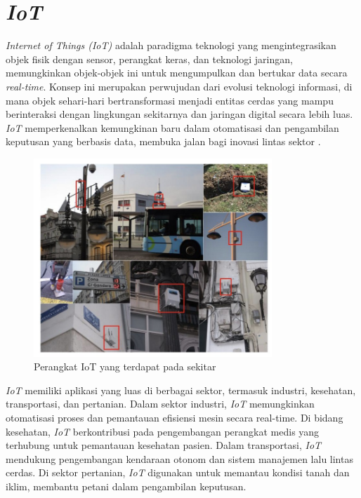 \section{\textit{IoT}}

\textit{Internet of Things (IoT)} adalah paradigma teknologi yang mengintegrasikan objek fisik dengan sensor, perangkat keras, dan teknologi jaringan, memungkinkan objek-objek ini untuk mengumpulkan dan bertukar data secara \textit{real-time}. Konsep ini merupakan perwujudan dari evolusi teknologi informasi, di mana objek sehari-hari bertransformasi menjadi entitas cerdas yang mampu berinteraksi dengan lingkungan sekitarnya dan jaringan digital secara lebih luas. \textit{IoT} memperkenalkan kemungkinan baru dalam otomatisasi dan pengambilan keputusan yang berbasis data, membuka jalan bagi inovasi lintas sektor \parencite{madakam2015internet}.

\begin{figure}[ht]
  \centering
  \includegraphics[width=0.8\textwidth]{resources/chapter-2/gambar-iot.jpg}
  \caption{Perangkat IoT yang terdapat pada sekitar \parencite{sotres2017practical}}
\end{figure}

\textit{IoT} memiliki aplikasi yang luas di berbagai sektor, termasuk industri, kesehatan, transportasi, dan pertanian. Dalam sektor industri, \textit{IoT} memungkinkan otomatisasi proses dan pemantauan efisiensi mesin secara real-time. Di bidang kesehatan, \textit{IoT} berkontribusi pada pengembangan perangkat medis yang terhubung untuk pemantauan kesehatan pasien. Dalam transportasi, \textit{IoT} mendukung pengembangan kendaraan otonom dan sistem manajemen lalu lintas cerdas. Di sektor pertanian, \textit{IoT} digunakan untuk memantau kondisi tanah dan iklim, membantu petani dalam pengambilan keputusan.


